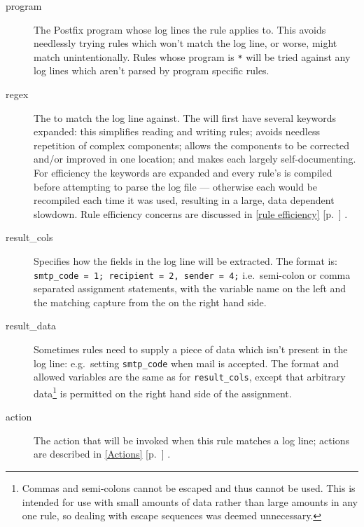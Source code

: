 \documentclass[draft]{svmult}
\newcommand{\refwithpage}[1]{%
    \empty{}\ref{#1} [p.~\pageref{#1}]%
}
\newcommand{\sectionref}[1]{%
    \textsection{}\refwithpage{#1}%
}
\newcommand{\tab}[0]{%
    \hspace*{2em}%
}
\begin{document}
\begin{description}

    \item [program] The Postfix program whose log lines the rule applies
        to.  This avoids needlessly trying rules which won't match the log
        line, or worse, might match unintentionally.  Rules whose program
        is \texttt{*} will be tried against any log lines which aren't
        parsed by program specific rules.

    \item [regex] The \regex{} to match the log line against.  The \regex{}
        will first have several keywords expanded: this simplifies reading
        and writing rules; avoids needless repetition of complex \regex{}
        components; allows the components to be corrected and/or improved
        in one location; and makes each \regex{} largely self-documenting.
        For efficiency the keywords are expanded and every rule's \regex{}
        is compiled before attempting to parse the log file --- otherwise
        each \regex{} would be recompiled each time it was used, resulting
        in a large, data dependent slowdown.  Rule efficiency concerns are
        discussed in \sectionref{rule efficiency}.

    \item [result\_cols] Specifies how the fields in the
        log line will be extracted.  The format is:
        \newline \tab{} \texttt{smtp\_code = 1; recipient = 2, sender = 4;}
        \newline i.e.\ semi-colon or comma separated assignment statements,
        with the variable name on the left and the matching capture from
        the \regex{} on the right hand side.

    \item [result\_data] Sometimes rules need to supply a piece of data
        which isn't present in the log line: e.g.\ setting
        \texttt{smtp\_code} when mail is accepted.  The format and allowed
        variables are the same as for \texttt{result\_cols}, except that
        arbitrary data\footnote{Commas and semi-colons cannot be escaped
        and thus cannot be used.  This is intended for use with small
        amounts of data rather than large amounts in any one rule, so
        dealing with escape sequences was deemed unnecessary.} is permitted
        on the right hand side of the assignment.

    \item [action] The action that will be invoked when this rule matches a
        log line; actions are described in \sectionref{Actions}.


\end{description}
\end{document}
